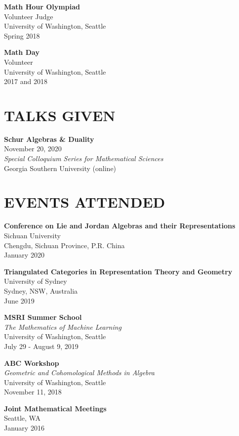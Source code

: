 \documentclass[margin]{res} %
\begin{document}
\begin{resume}
{\bf Math Hour Olympiad}\\
Volunteer Judge \\
University of Washington, Seattle\\
Spring 2018

{\bf Math Day}\\
Volunteer\\
University of Washington, Seattle\\
2017 and 2018

\section{TALKS GIVEN}

\textbf{Schur Algebras \& Duality}\\
November 20, 2020\\
\textit{Special Colloquium Series for Mathematical Sciences}\\
Georgia Southern University (online)

\section{\bf EVENTS ATTENDED}

{\bf Conference on Lie and Jordan Algebras and their Representations}\\
Sichuan University\\
Chengdu, Sichuan Province, P.R. China\\
January 2020

{\bf Triangulated Categories in Representation Theory and Geometry}\\
University of Sydney\\
Sydney, NSW, Australia\\
June 2019

{\bf MSRI Summer School}\\
{\sl The Mathematics of Machine Learning}\\
University of Washington, Seattle\\
July 29 - August 9, 2019

{\bf ABC Workshop}\\
{\sl Geometric and Cohomological Methods in Algebra}\\
University of Washington, Seattle\\
November 11, 2018

{\bf Joint Mathematical Meetings}\\
Seattle, WA\\
January 2016


\end{resume}
\end{document}
